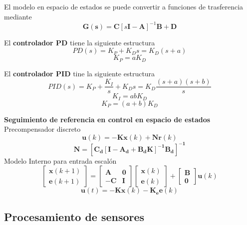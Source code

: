 El modelo en espacio de estados se puede convertir a funciones de trasferencia mediante
\begin{equation}
	\label{eq:ss2tf}
	\mathbf{G(s)} = \mathbf{C} \left[s\mathbf{I - A}\right]^{-1} \mathbf{B + D}
\end{equation}

El \textbf{controlador PD} tiene la siguiente estructura
\begin{equation}
	\label{eq:c_pd}
    PD(s) = K_P + K_D s = K_D(s+a)
\end{equation}
\[K_P = a K_D\]

El \textbf{controlador PID} tine la siguiente estructura
\begin{equation}
	\label{eq:c_pid}
    PID(s) = K_P + \frac{K_I}{s}+ K_D s = K_D\frac{(s+a)(s+b)}{s}
\end{equation}
\[K_I = abK_D\]
\[K_P= (a+b)K_D\]

\textbf{Seguimiento de referencia en control en espacio de estados}
\\Precompensador discreto \cite{fadaliServo2013}
\begin{equation}
	\mathbf{u}(k) = -\mathbf{Kx}(k)+\mathbf{Nr}(k)
\end{equation}
\begin{equation}
	\mathbf{N = [C_d[I-A_d+B_dK]^{-1}B_d]^{-1}}
\end{equation}
Modelo Interno para entrada escalón \cite{fadaliServo2013}
\begin{equation}
	\label{eq:c_mi}
	\begin{bmatrix}
		\mathbf{x}(k+1) \\
		\mathbf{e}(k+1)
	\end{bmatrix}
	=
	\begin{bmatrix}
		\mathbf{A} & \mathbf{0}\\
		-\mathbf{C} & \mathbf{I}
	\end{bmatrix}
	\begin{bmatrix}
		\mathbf{x}(k) \\
		\mathbf{e}(k)
	\end{bmatrix}
	+
	\begin{bmatrix}
		\mathbf{B}\\
		\mathbf{0}
	\end{bmatrix}
	\mathbf{u}(k)
\end{equation}
\[\mathbf{u}(t) = \mathbf{-Kx}(k)-\mathbf{K_ee}(k)\]

\subsection{Procesamiento de sensores}

